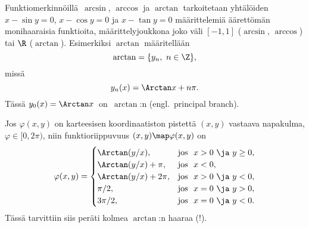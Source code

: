 Funktiomerkinnöillä $\,\arcsin$, $\arccos$ ja $\arctan$ tarkoitetaan yhtälöiden $x-\sin y =0$,
$x-\cos y=0$ ja $x-\tan y=0$ määrittelemiä äärettömän monihaaraisia funktioita,
määrittelyjoukkona joko väli $[-1,1]$ ($\arcsin,\,\arccos$) tai $\R$ ($\arctan$). Esimerkiksi
$\arctan$  määritellään
\[
\arctan = \{y_n, \ n\in\Z\},
\]
missä
\[
y_n(x)= \Arctan x + n\pi.
\]
Tässä $y_0(x)=\Arctan x\,$ on $\,\arctan$:n
%
 (engl.\ principal branch).
\begin{Exa} \label{napakulman kaava} Jos $\varphi(x,y)$ on karteesisen koordinaatiston
pistettä $(x,y)$ vastaava napakulma, $\varphi\in[0,2\pi)$, niin funktioriippuvuus 
$(x,y)\map\varphi(x,y)$ on
\[
\varphi(x,y)=
\begin{cases}
\Arctan(y/x),      &\text{jos}\ \ x>0\ \ja\ y\geq 0, \\
\Arctan(y/x)+\pi,  &\text{jos}\ \ x<0, \\
\Arctan(y/x)+2\pi, &\text{jos}\ \ x>0\ \ja\ y<0, \\
\pi/2,             &\text{jos}\ \ x=0\ \ja\ y>0, \\
3\pi/2,            &\text{jos}\ \ x=0\ \ja\ y<0.
\end{cases}
\]
Tässä tarvittiin siis peräti kolmea $\arctan$:n haaraa (!).
\loppu
\begin{figure}[H]
\begin{center}

\end{center}
\end{figure}
\end{Exa}


